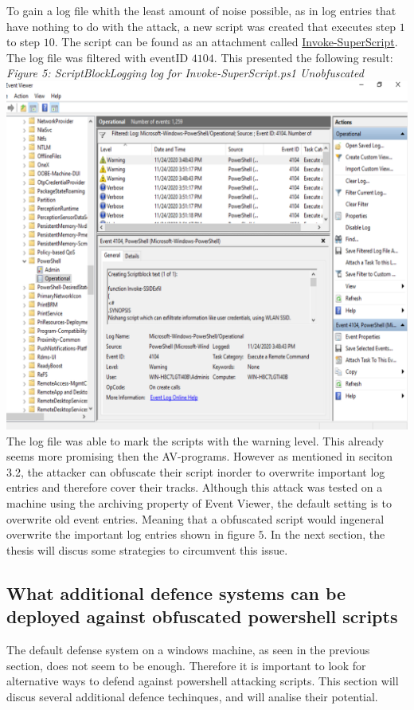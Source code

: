 \documentclass{article}%
\begin{document}
To gain a log file whith the least amount of noise possible, as in log entries that have nothing to do with the attack, a new script was created that executes step $1$ to step $10$. The script can be found as an attachment called \hyperlink{script3}{Invoke-SuperScript}. The log file was filtered with eventID $4104$. This presented the following result:
\newpage
\textit{Figure 5: ScriptBlockLogging log for Invoke-SuperScript.ps1 Unobfuscated}\\
\includegraphics[scale=0.45]{21.png}
The log file was able to mark the scripts with the warning level. This already seems more promising then the AV-programs. However as mentioned in seciton 3.2, the attacker can obfuscate their script inorder to overwrite important log entries and therefore cover their tracks. Although this attack was tested on a machine using the archiving property of Event Viewer, the default setting is to overwrite old event entries. Meaning that a obfuscated script would ingeneral overwrite the important log entries shown in figure $5$. In the next section, the thesis will discus some strategies to circumvent this issue.
\newpage
\subsection{What additional defence systems can be deployed against obfuscated powershell scripts}
The default defense system on a windows machine, as seen in the previous section, does not seem to be enough. Therefore it is important to look for alternative ways to defend against powershell attacking scripts. This section will discus several additional defence techinques, and will analise their potential.
\end{document}
